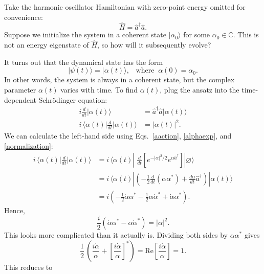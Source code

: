 \documentclass[prx,12pt]{revtex4-2}
\begin{document}
Take the harmonic oscillator Hamiltonian with zero-point energy
omitted for convenience:
\begin{equation}
  \hat{H} = \hat{a}^\dagger \hat{a}.
\end{equation}
Suppose we initialize the system in a coherent state
$|\alpha_0\rangle$ for some $\alpha_0 \in \mathbb{C}$.  This is not an
energy eigenstate of $\hat{H}$, so how will it subsequently evolve?

It turns out that the dynamical state has the form
\begin{equation}
  |\psi(t)\rangle = |\alpha(t)\rangle, \;\;\;\mathrm{where}\;\;\alpha(0) = \alpha_0.
\end{equation}
In other words, the system is always in a coherent state, but the
complex parameter $\alpha(t)$ varies with time.  To find $\alpha(t)$,
plug the ansatz into the time-dependent Schr\"odinger equation:
\begin{align}
  i \frac{d}{dt} |\alpha(t)\rangle &= \hat{a}^\dagger \hat{a} |\alpha(t)\rangle\\
  i \,\Big\langle\alpha(t)\Big| \frac{d}{dt} \Big|\alpha(t)\Big\rangle &=
  |\alpha(t)|^2.
\end{align}
We can calculate the left-hand side using Eqs.~\eqref{aaction},
\eqref{alphaexp}, and \eqref{normalization}:
\begin{align}
  i \, \Big\langle\alpha(t)\Big| \frac{d}{dt} \Big|\alpha(t)\Big\rangle
  &= i\, \langle \alpha(t) | \; \frac{d}{dt}
  \left[ e^{-|\alpha|^2/2} e^{\alpha\hat{a}^\dagger} \right]
  |\varnothing\rangle \\
  &= i\, \langle \alpha(t) | \left(-\frac{1}{2} \frac{d}{dt}(\alpha\alpha^*)
  + \frac{d\alpha}{dt} \hat{a}^\dagger \right) |\alpha(t)\rangle \\
  &= i \left(-\frac{1}{2} \dot{\alpha}\alpha^*
  - \frac{1}{2}\alpha\dot{\alpha}^* + \dot{\alpha}\alpha^*\right).
\end{align}
Hence,
\begin{equation}
  \frac{i}{2}\left(\dot{\alpha}\alpha^* - \alpha\dot{\alpha}^*\right) = |\alpha|^2.
  \label{eom}
\end{equation}
This looks more complicated than it actually is.  Dividing both sides by
$\alpha \alpha^*$ gives
\begin{equation}
  \frac{1}{2}\, \left(\frac{i\dot{\alpha}}{\alpha} + \left[\frac{i\dot{\alpha}}{\alpha}\right]^*\right) = \mathrm{Re}\left[\frac{i\dot{\alpha}}{\alpha}\right] = 1.
\end{equation}
This reduces to
\end{document}
